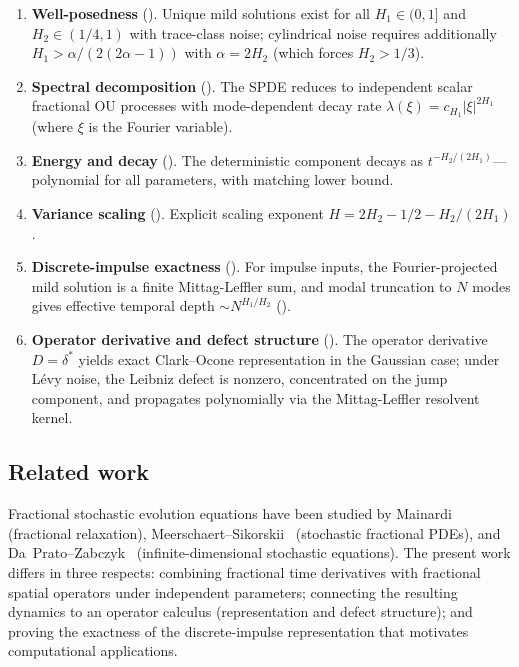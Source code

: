 \documentclass[11pt]{article}
\theoremstyle{definition}
\theoremstyle{remark}
\begin{document}
\begin{enumerate}[label=\textbf{(\Alph*)}]
\item \textbf{Well-posedness}
  ().
  Unique mild solutions exist for all
  $H_1 \in (0,1]$ and $H_2 \in (1/4,1)$ with
  trace-class noise; cylindrical noise requires
  additionally $H_1 > \alpha/(2(2\alpha-1))$ with
  $\alpha = 2H_2$ (which forces $H_2 > 1/3$).

\item \textbf{Spectral decomposition}
  ().  The SPDE reduces to
  independent scalar fractional OU processes
  with mode-dependent decay rate
  $\lambda(\xi) = c_{H_1}|\xi|^{2H_1}$
  (where $\xi$ is the Fourier variable).

\item \textbf{Energy and decay}
  ().  The
  deterministic component decays as
  $t^{-H_2/(2H_1)}$---polynomial for all
  parameters, with matching lower bound.

\item \textbf{Variance scaling}
  ().  Explicit scaling
  exponent
  $H = 2H_2 - 1/2 - H_2/(2H_1)$.

\item \textbf{Discrete-impulse exactness}
  ().  For impulse
  inputs, the Fourier-projected mild solution
  is a finite Mittag-Leffler sum, and modal
  truncation to $N$ modes gives effective
  temporal depth $\sim N^{H_1/H_2}$
  ().

\item \textbf{Operator derivative and defect
  structure}
  ().
  The operator derivative $D = \delta^*$ yields
  exact Clark--Ocone representation in the Gaussian
  case; under L\'evy noise, the Leibniz defect is
  nonzero, concentrated on the jump component, and
  propagates polynomially via the Mittag-Leffler
  resolvent kernel.
\end{enumerate}

\subsection{Related work}

Fractional stochastic evolution equations have been
studied by Mainardi~\cite{mainardi2010} (fractional
relaxation), Meerschaert--Sikorskii~\cite{meerschaert2012}
(stochastic fractional PDEs), and
Da~Prato--Zabczyk~\cite{daprato2014}
(infinite-dimensional stochastic equations).  The
present work differs in three respects: combining
fractional time derivatives with fractional spatial
operators under independent parameters; connecting
the resulting dynamics to an operator calculus
(representation and defect structure); and proving the
exactness of the discrete-impulse representation that
motivates computational applications.
\end{document}
